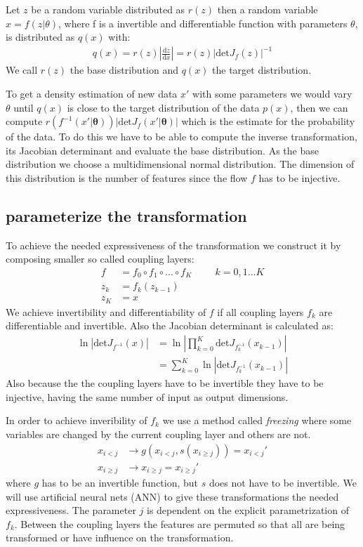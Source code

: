\documentclass[%
 reprint,
 amsmath,amssymb,
 aps,
]{revtex4-2}
\begin{document}
Let $z$ be a random variable distributed as $r(z)$ then a random variable $x = f(z|\theta)$, where f is a invertible and differentiable function with parameters $\theta$, is distributed as $q(x)$ with:
\begin{align*}
	q(x) = r(z)\left|\frac{\text{d} z}{\text{d} x}\right| = r(z)\left|\text{det}J_f(z)\right|^{-1}
\end{align*}
We call $r(z)$ the base distribution and $q(x)$ the target distribution.

To get a density estimation of new data $x'$ with some parameters we would vary $\theta$ until $q(x)$ is close to the target distribution of the data $p(x)$, then we can compute $r(f^{-1}(x'|\mathbf{\theta}))\left|\text{det}J_f(x'|\mathbf{\theta})\right|$ which is the estimate for the probability of the data. To do this we have to be able to compute the inverse transformation, its Jacobian determinant and evaluate the base distribution. As the base distribution we choose a multidimensional normal distribution. The dimension of this distribution is the number of features since the flow $f$ has to be injective.
\subsection{parameterize the transformation}
\label{sec:param trafo}
To achieve the needed expressiveness of the transformation we construct it by composing smaller so called coupling layers:
\begin{align*}
	f &= f_0 \circ f_1 \circ ... \circ f_K \hspace{1cm} k=0,1...K \\
	z_k &= f_k(z_{k-1})\\
	z_K &= x
\end{align*}
We achieve invertibility and differentiability of $f$ if all coupling layers $f_k$ are differentiable and invertible. Also the Jacobian determinant is calculated as:
\begin{align*}
	\ln\left|\text{det}J_{f^{-1}}(x)\right| &= \ln\left|\prod_{k=0}^{K}\text{det}J_{f_{k}^{-1}}(x_{k-1})\right| \\
	&= \sum_{k=0}^{K}\ln\left|\text{det}J_{f_{k}^{-1}}(x_{k-1})\right|
\end{align*}
Also because the the coupling layers have to be invertible they have to be injective, having the same number of input as output dimensions. 

In order to achieve inveribility of $f_k$ we use a method called \textit{freezing} where some variables are changed by the current coupling layer and others are not. 
\begin{align*}
	x_{i<j} &\rightarrow g(x_{i<j},s(x_{i\geq j})) = 	x_{i<j}'\\
	x_{i\geq j} &\rightarrow x_{i\geq j} = x_{i\geq j}'
\end{align*}
where $g$ has to be an invertible function, but $s$ does not have to be invertible. We will use artificial neural nets (ANN) to give these transformations the needed expressiveness. The parameter $j$ is dependent on the explicit parametrization of $f_k$. Between the coupling layers the features are permuted so that all are being transformed or have influence on the transformation.
\end{document}
